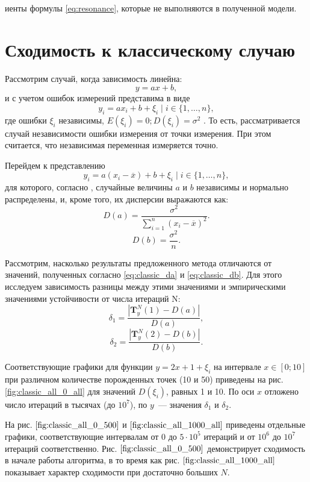 \documentclass[12pt,a4paper]{article}
\theoremstyle{definition}
\begin{document}
иенты формулы \eqref{eq:resonance},
которые не выполняются в полученной модели.

\section{Сходимость к классическому случаю}

Рассмотрим случай, когда зависимость линейна:
\[
  y = ax + b,
\]
и с учетом ошибок измерений представима в виде
\[
  y_i = ax_i + b + \xi_i \mid i \in \{ 1, \dots, n \},
\]
где ошибки $\xi_i$ независимы, $E(\xi_i) = 0; D(\xi_i) = \sigma^2$ \cite{Vatunin05}.
То есть, рассматривается случай независимости ошибки измерения от точки измерения.
При этом считается, что независимая переменная измеряется точно.

Перейдем к представлению
\[
  y_i = a(x_i - \overline{x}) + b + \xi_i \mid i \in \{ 1, \dots, n \},
\]
для которого, согласно \cite{Vatunin05}, случайные величины $a$ и $b$ независимы
и нормально распределены, и, кроме того, их дисперсии выражаются как:
\begin{equation}
  \label{eq:classic_da}
  D(a) = \frac{\sigma^2}{\sum_{i = 1}^n (x_i - \overline{x})^2}.
\end{equation}
\begin{equation}
  \label{eq:classic_db}
  D(b) = \frac{\sigma^2}{n}.
\end{equation}

Рассмотрим, насколько результаты предложенного метода отличаются от значений,
полученных согласно \eqref{eq:classic_da} и \eqref{eq:classic_db}. Для этого исследуем
зависимость разницы между этими значениями и эмпирическими значениями устойчивости от
числа итераций N:
\[
  \delta_1 = \frac{| \mathbf{T}^N_y(1) - D(a) |}{D(a)},
\]
\[
  \delta_2 = \frac{| \mathbf{T}^N_y(2) - D(b) |}{D(b)}.
\]

Соответствующие графики для функции $y = 2x + 1 + \xi_i$ на интервале $x \in [0; 10]$ при
различном количестве порожденных точек (10 и 50) приведены на рис. \ref{fig:classic_all_0_all}
для значений $D(\xi_i)$, равных 1 и 10. По оси $x$ отложено
число итераций в тысячах (до $10^7$), по $y$~--- значения $\delta_1$ и $\delta_2$.

На рис. $\ref{fig:classic_all_0_500}$ и $\ref{fig:classic_all_1000_all}$ приведены
отдельные графики, соответствующие интервалам от 0 до $5 \cdot 10^5$ итераций и от $10^6$ до
$10^7$ итераций соответственно. Рис. $\ref{fig:classic_all_0_500}$ демонстрирует
сходимость в начале работы алгоритма, в то время как рис. $\ref{fig:classic_all_1000_all}$
показывает характер сходимости при достаточно больших $N$.
\end{document}
